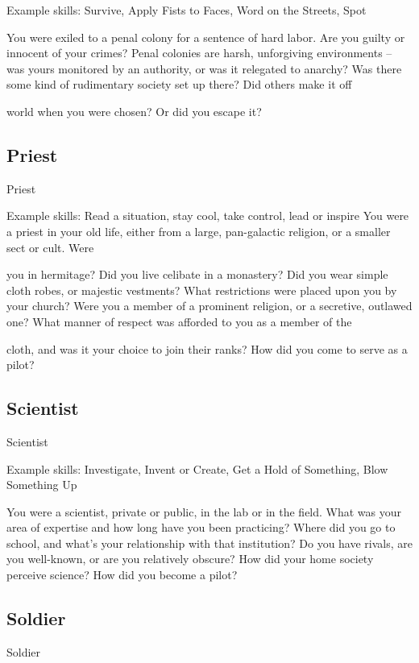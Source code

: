 Example skills: Survive, Apply Fists to Faces, Word on the Streets, Spot


You were exiled to a penal colony for a sentence of hard labor. Are you guilty or innocent of your crimes?
Penal colonies are harsh, unforgiving environments -- was yours monitored by an authority, or was it
relegated to anarchy? Was there some kind of rudimentary society set up there? Did others make it off

world when you were chosen? Or did you escape it?

\subsection{Priest}
                                                        Priest

Example skills: Read a situation, stay cool, take control, lead or inspire
You were a priest in your old life, either from a large, pan-galactic religion, or a smaller sect or cult. Were

you in hermitage? Did you live celibate in a monastery? Did you wear simple cloth robes, or majestic
vestments? What restrictions were placed upon you by your church? Were you a member of a prominent
religion, or a secretive, outlawed one? What manner of respect was afforded to you as a member of the

cloth, and was it your choice to join their ranks? How did you come to serve as a pilot?

\subsection{Scientist}

                                                     Scientist

Example skills: Investigate, Invent or Create, Get a Hold of Something, Blow Something Up

You were a scientist, private or public, in the lab or in the field. What was your area of expertise and how
long have you been practicing? Where did you go to school, and what’s your relationship with that
institution? Do you have rivals, are you well-known, or are you relatively obscure? How did your home society perceive science? How did you become a pilot?

\subsection{Soldier}
                                                       Soldier

